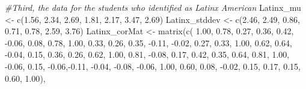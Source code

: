 \documentclass[
  english,
]{book}
\newenvironment{Shaded}{\begin{snugshade}}{\end{snugshade}}
\newcommand{\CommentTok}[1]{\textcolor[rgb]{0.56,0.35,0.01}{\textit{#1}}}
\newcommand{\FloatTok}[1]{\textcolor[rgb]{0.00,0.00,0.81}{#1}}
\newcommand{\FunctionTok}[1]{\textcolor[rgb]{0.00,0.00,0.00}{#1}}
\newcommand{\NormalTok}[1]{#1}
\newcommand{\OtherTok}[1]{\textcolor[rgb]{0.56,0.35,0.01}{#1}}
\newcommand{\SpecialCharTok}[1]{\textcolor[rgb]{0.00,0.00,0.00}{#1}}
\begin{document}
\begin{Shaded}
\begin{Highlighting}[]
\CommentTok{\#Third, the data for the students who identified as Latinx American}
\NormalTok{Latinx\_mu }\OtherTok{\textless{}{-}} \FunctionTok{c}\NormalTok{(}\FloatTok{1.56}\NormalTok{, }\FloatTok{2.34}\NormalTok{, }\FloatTok{2.69}\NormalTok{, }\FloatTok{1.81}\NormalTok{, }\FloatTok{2.17}\NormalTok{, }\FloatTok{3.47}\NormalTok{, }\FloatTok{2.69}\NormalTok{)}
\NormalTok{Latinx\_stddev }\OtherTok{\textless{}{-}} \FunctionTok{c}\NormalTok{(}\FloatTok{2.46}\NormalTok{, }\FloatTok{2.49}\NormalTok{, }\FloatTok{0.86}\NormalTok{, }\FloatTok{0.71}\NormalTok{, }\FloatTok{0.78}\NormalTok{, }\FloatTok{2.59}\NormalTok{, }\FloatTok{3.76}\NormalTok{)}
\NormalTok{Latinx\_corMat }\OtherTok{\textless{}{-}} \FunctionTok{matrix}\NormalTok{(}\FunctionTok{c}\NormalTok{( }\FloatTok{1.00}\NormalTok{,  }\FloatTok{0.78}\NormalTok{,  }\FloatTok{0.27}\NormalTok{,  }\FloatTok{0.36}\NormalTok{,  }\FloatTok{0.42}\NormalTok{, }\SpecialCharTok{{-}}\FloatTok{0.06}\NormalTok{,  }\FloatTok{0.08}\NormalTok{,}
                           \FloatTok{0.78}\NormalTok{,  }\FloatTok{1.00}\NormalTok{,  }\FloatTok{0.33}\NormalTok{,  }\FloatTok{0.26}\NormalTok{,  }\FloatTok{0.35}\NormalTok{, }\SpecialCharTok{{-}}\FloatTok{0.11}\NormalTok{, }\SpecialCharTok{{-}}\FloatTok{0.02}\NormalTok{,}
                           \FloatTok{0.27}\NormalTok{,  }\FloatTok{0.33}\NormalTok{,  }\FloatTok{1.00}\NormalTok{,  }\FloatTok{0.62}\NormalTok{,  }\FloatTok{0.64}\NormalTok{, }\SpecialCharTok{{-}}\FloatTok{0.04}\NormalTok{,  }\FloatTok{0.15}\NormalTok{,}
                           \FloatTok{0.36}\NormalTok{,  }\FloatTok{0.26}\NormalTok{,  }\FloatTok{0.62}\NormalTok{,  }\FloatTok{1.00}\NormalTok{,  }\FloatTok{0.81}\NormalTok{, }\SpecialCharTok{{-}}\FloatTok{0.08}\NormalTok{,  }\FloatTok{0.17}\NormalTok{,}
                           \FloatTok{0.42}\NormalTok{,  }\FloatTok{0.35}\NormalTok{,  }\FloatTok{0.64}\NormalTok{,  }\FloatTok{0.81}\NormalTok{,  }\FloatTok{1.00}\NormalTok{, }\SpecialCharTok{{-}}\FloatTok{0.06}\NormalTok{,  }\FloatTok{0.15}\NormalTok{,}
                           \SpecialCharTok{{-}}\FloatTok{0.06}\NormalTok{,}\SpecialCharTok{{-}}\FloatTok{0.11}\NormalTok{, }\SpecialCharTok{{-}}\FloatTok{0.04}\NormalTok{, }\SpecialCharTok{{-}}\FloatTok{0.08}\NormalTok{, }\SpecialCharTok{{-}}\FloatTok{0.06}\NormalTok{,  }\FloatTok{1.00}\NormalTok{,  }\FloatTok{0.60}\NormalTok{,}
                           \FloatTok{0.08}\NormalTok{, }\SpecialCharTok{{-}}\FloatTok{0.02}\NormalTok{,  }\FloatTok{0.15}\NormalTok{,  }\FloatTok{0.17}\NormalTok{,  }\FloatTok{0.15}\NormalTok{,  }\FloatTok{0.60}\NormalTok{,  }\FloatTok{1.00}\NormalTok{),}

\end{Highlighting}
\end{Shaded}
\end{document}
